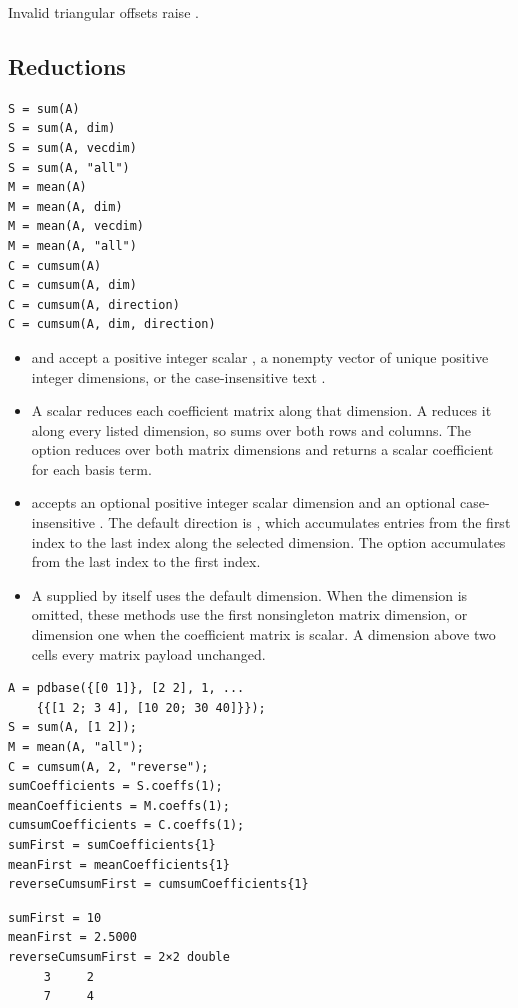 \remarkshead
Invalid triangular offsets raise .

\subsection{Reductions}
\label{sec:pdbase-matrix-reductions}

\syntaxhead
\begin{lstlisting}[style=dpsyntax]
S = sum(A)
S = sum(A, dim)
S = sum(A, vecdim)
S = sum(A, "all")
M = mean(A)
M = mean(A, dim)
M = mean(A, vecdim)
M = mean(A, "all")
C = cumsum(A)
C = cumsum(A, dim)
C = cumsum(A, direction)
C = cumsum(A, dim, direction)
\end{lstlisting}

\descriptionhead
\begin{itemize}[leftmargin=*]
    \item {} and  accept a positive integer scalar , a nonempty vector  of unique positive integer dimensions, or the case-insensitive text .
    \item A scalar  reduces each coefficient matrix along that dimension. A  reduces it along every listed dimension, so  sums over both rows and columns. The option  reduces over both matrix dimensions and returns a scalar coefficient for each basis term.
    \item {} accepts an optional positive integer scalar dimension and an optional case-insensitive . The default direction is , which accumulates entries from the first index to the last index along the selected dimension. The option  accumulates from the last index to the first index.
    \item A  supplied by itself uses the default dimension. When the dimension is omitted, these methods use the first nonsingleton matrix dimension, or dimension one when the coefficient matrix is scalar. A dimension above two cells every matrix payload unchanged.
\end{itemize}

\examplehead
\begin{lstlisting}[style=dpmatlab]
A = pdbase({[0 1]}, [2 2], 1, ...
    {{[1 2; 3 4], [10 20; 30 40]}});
S = sum(A, [1 2]);
M = mean(A, "all");
C = cumsum(A, 2, "reverse");
sumCoefficients = S.coeffs(1);
meanCoefficients = M.coeffs(1);
cumsumCoefficients = C.coeffs(1);
sumFirst = sumCoefficients{1}
meanFirst = meanCoefficients{1}
reverseCumsumFirst = cumsumCoefficients{1}
\end{lstlisting}
\begin{lstlisting}[style=dpoutput]
sumFirst = 10
meanFirst = 2.5000
reverseCumsumFirst = 2×2 double
     3     2
     7     4
\end{lstlisting}


